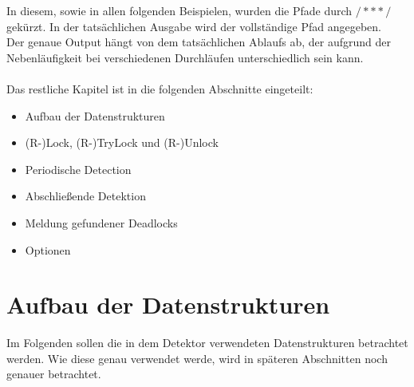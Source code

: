 In diesem, sowie in allen folgenden Beispielen, wurden die Pfade durch $/***/$ 
gekürzt. In der tatsächlichen
Ausgabe wird der vollständige Pfad angegeben.\\ 
Der genaue Output hängt von dem tatsächlichen Ablaufs ab, der aufgrund der 
Nebenläufigkeit bei verschiedenen Durchläufen unterschiedlich sein kann.\\\\
Das restliche Kapitel ist in die folgenden Abschnitte eingeteilt:
\begin{itemize}
  \item Aufbau der Datenstrukturen
  \item (R-)Lock, (R-)TryLock und (R-)Unlock
  \item Periodische Detection
  \item Abschließende Detektion
  \item Meldung gefundener Deadlocks
  \item Optionen
\end{itemize}
\section{Aufbau der Datenstrukturen} \label{Kap::Implementation:Datastructures}
Im Folgenden sollen die in dem Detektor verwendeten Datenstrukturen betrachtet 
werden. Wie diese genau verwendet werde, wird in späteren Abschnitten noch 
genauer betrachtet.
